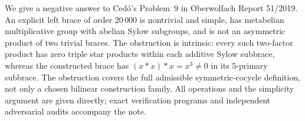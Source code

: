 We give a negative answer to Ced\'o's Problem~9 in Oberwolfach Report
51/2019. An explicit left brace of order $20\,000$ is nontrivial and
simple, has metabelian multiplicative group with abelian Sylow
subgroups, and is not an asymmetric product of two trivial braces.
The obstruction is intrinsic: every such two-factor product has zero
triple star products within each additive Sylow subbrace, whereas the
constructed brace has $(x*x)*x=x^3\ne0$ in its $5$-primary subbrace.
The obstruction covers the full admissible symmetric-cocycle definition,
not only a chosen bilinear construction family. All operations and the
simplicity argument are given directly; exact verification programs and
independent adversarial audits accompany the note.
